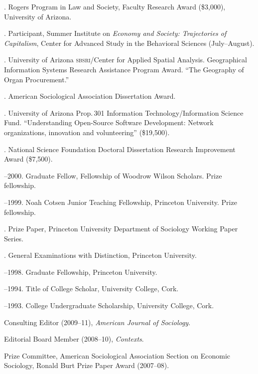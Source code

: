 \documentclass[11pt]{article}
\begin{document}
. Rogers Program in Law and Society, Faculty Research Award
(\$3,000), University of Arizona.

. Participant, Summer Institute on \emph{Economy and Society: Trajectories of Capitalism}, Center for Advanced Study in the Behavioral Sciences (July--August).

. University of Arizona \textsc{sbsri}/Center for Applied Spatial
Analysis. Geographical Information Systems Research Assistance
Program Award. ``The Geography of Organ Procurement.''

. American Sociological Association Dissertation Award.

. University of Arizona Prop.\,301 Information Technology/Information Science Fund. ``Understanding Open-Source Software Development: Network organizations, innovation and volunteering'' (\$19,500).

. National Science Foundation Doctoral Dissertation Research Improvement Award (\$7,500).

--2000. Graduate Fellow, Fellowship of Woodrow Wilson Scholars. Prize fellowship.

--1999. Noah Cotsen Junior Teaching Fellowship, Princeton University. Prize fellowship.

. Prize Paper, Princeton University Department of Sociology Working Paper Series.

. General Examinations with Distinction, Princeton University.

--1998. Graduate Fellowship, Princeton University.

--1994. Title of College Scholar, University College, Cork.

--1993. College Undergraduate Scholarship, University
College, Cork.


\bigskip 

\newpage

\medskip

\medskip

\ind Consulting Editor (2009--11), \emph{American Journal of Sociology}.

\ind Editorial Board Member (2008--10), \emph{Contexts}. 

\ind Prize Committee, American Sociological Association Section on Economic Sociology, Ronald Burt Prize Paper Award (2007--08).
\end{document}
